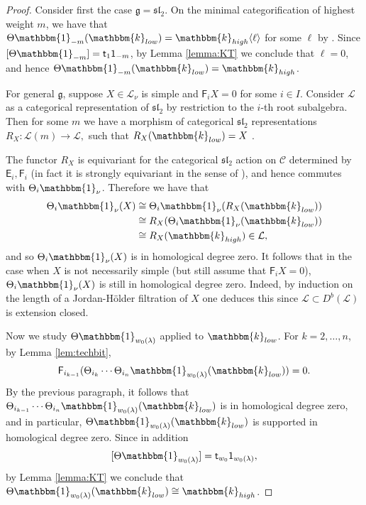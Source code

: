 \documentclass[11pt,reqno]{amsart}
\numberwithin{equation}{section}
\theoremstyle{definition}
\theoremstyle{named}
\newcommand{\cC}{\mathcal{C}}
\newcommand{\sE}{\mathsf{E}}
\newcommand{\sF}{\mathsf{F}}
\newcommand{\cL}{\mathcal{L}}
\newcommand{\fg}{\mathfrak{g}}
\newcommand{\kk}{\mathbbm{k}}
\newcommand{\st}{\mathsf{t}}
\newcommand{\fsl}{\mathfrak{sl}}
\newcommand{\bone}{\mathbbm{1}}
\newcommand{\sone}{\mathsf{1}}
\begin{document}
\begin{proof}
Consider first the case $\fg=\fsl_2$.  On the minimal categorification of highest weight $m$, we have that $\Theta\bone_{-m}(\kk_{low})=\kk_{high}\langle \ell \rangle$ for some $\ell$ by \cite[Theorem 6.6]{CR}.  Since $[\Theta\bone_{-m}]=\st_{1}\sone_{-m}$, by Lemma \ref{lemma:KT} we conclude that $\ell=0$, and hence $\Theta\bone_{-m}(\kk_{low})=\kk_{high}$.

For general $\fg$, suppose $X \in \cL_\nu$ is simple and  $\sF_iX=0$ for some $i \in I$.  Consider $\cL$ as a categorical representation of $\fsl_2$ by restriction to the $i$-th root subalgebra. 
Then for some $m$ we have a morphism of categorical $\fsl_2$ representations
$
R_X:\cL(m) \to \cL,
$
such that $R_X(\kk_{low})=X$ \cite[Theorem 5.24]{CR}.  

The functor $R_X$ is equivariant for the categorical $\fsl_2$ action on $\cC$ determined by $\sE_i,\sF_i$ (in fact it is strongly equivariant in the sense of \cite[Definition 3.1]{LoWe}), and hence commutes with $\Theta_i\bone_\nu$.  Therefore we have that 
\begin{align*}
\Theta_i\bone_{\nu}(X) &\cong  \Theta_i\bone_{\nu}(R_X(\kk_{low})) \\
&\cong R_X(\Theta_i\bone_{\nu}(\kk_{low})) \\
&\cong R_X(\kk_{high}) \in \cL,
\end{align*}
and so $\Theta_i\bone_{\nu}(X)$ is in homological degree zero.  
It follows that in the case when $X$ is not necessarily simple (but still assume that $\sF_iX=0$), $\Theta_i\bone_{\nu}(X)$ is still in homological degree zero.  Indeed, by induction on the length of a Jordan-H\"older filtration of $X$ one deduces this since $\cL \subset D^b(\cL)$ is extension closed. 

%
%
%
Now we study $\Theta\bone_{w_0(\lambda)}$ applied to $\kk_{low}$.  For $k=2,\hdots,n$, by Lemma \ref{lem:techbit}, $$\sF_{i_{k-1}}(\Theta_{i_k}\cdots\Theta_{i_n}\bone_{w_0(\lambda)}(\kk_{low}))=0.$$ By the previous paragraph, it follows that $\Theta_{i_{k-1}}\cdots\Theta_{i_n}\bone_{w_0(\lambda)}(\kk_{low})$ is in homological degree zero, and in particular, $\Theta\bone_{w_0(\lambda)}(\kk_{low})$ is supported in homological degree zero.  Since in addition $$[\Theta\bone_{w_0(\lambda)}]=\st_{w_0}\sone_{w_0(\lambda)},$$ by Lemma \ref{lemma:KT} we conclude that $\Theta\bone_{w_0(\lambda)}(\kk_{low})\cong\kk_{high}$.
\end{proof}
\end{document}
